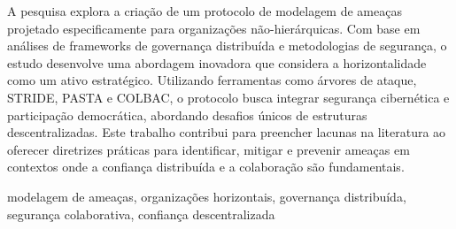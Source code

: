 
%

A pesquisa explora a criação de um protocolo de modelagem de ameaças projetado
especificamente para organizações não-hierárquicas. Com base em análises de
frameworks de governança distribuída e metodologias de segurança, o estudo
desenvolve uma abordagem inovadora que considera a horizontalidade como um ativo
estratégico. Utilizando ferramentas como árvores de ataque, STRIDE, PASTA e
COLBAC, o protocolo busca integrar segurança cibernética e participação
democrática, abordando desafios únicos de estruturas descentralizadas. Este
trabalho contribui para preencher lacunas na literatura ao oferecer diretrizes
práticas para identificar, mitigar e prevenir ameaças em contextos onde a
confiança distribuída e a colaboração são fundamentais.

\begin{keywords}
  modelagem de ameaças, organizações horizontais, governança distribuída,
  segurança colaborativa, confiança descentralizada
\end{keywords}
  